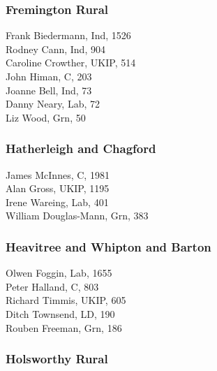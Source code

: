 \documentclass[a4paper,openany,10pt]{book}
\begin{document}
\subsubsection*{Fremington Rural}



Frank Biedermann, Ind, 1526\\
Rodney Cann, Ind, 904\\
Caroline Crowther, UKIP, 514\\
John Himan, C, 203\\
Joanne Bell, Ind, 73\\
Danny Neary, Lab, 72\\
Liz Wood, Grn, 50\\


\subsubsection*{Hatherleigh and Chagford}



James McInnes, C, 1981\\
Alan Gross, UKIP, 1195\\
Irene Wareing, Lab, 401\\
{William Douglas-Mann}, Grn, 383\\


\subsubsection*{Heavitree and Whipton and Barton}



Olwen Foggin, Lab, 1655\\
Peter Halland, C, 803\\
Richard Timmis, UKIP, 605\\
Ditch Townsend, LD, 190\\
Rouben Freeman, Grn, 186\\


\subsubsection*{Holsworthy Rural}

\end{document}
